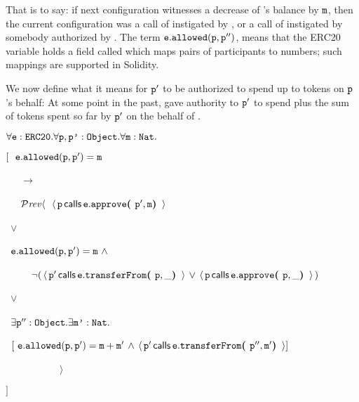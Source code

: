 \noindent
That is to say: if next configuration witnesses a decrease of 's balance by
 $\prg{m}$, then the current configuration was a call of  instigated by
 , or  a call of  instigated by somebody authorized by .
 The term $\prg{e}.\prg{allowed}(\prg{p},\prg{p}'')$,  means that the
ERC20 variable  holds a field called    which maps pairs of participants to numbers; such
mappings are supported in Solidity\cite{Solidity}.
 
We now define what it means for $\prg{p}'$ to be authorized  to  spend 
up to  tokens on  $\prg{p}$'s behalf: At some point in the
past,   gave authority to $\prg{p}'$  to spend   
plus the sum of  tokens
spent so far by $\prg{p}' $ on the behalf of . 

 
\vspace{.15cm}
\noindent
 $\forall \prg{e}:\prg{ERC20}.\forall \prg{p},\prg{p'}:\prg{Object}.\forall \prg{m}:\prg{Nat}.$\\
\strut \hspace{0.3cm} $[\ \ \prg{e}.\prg{allowed}(\prg{p},\prg{p}')=\prg{m} $\\
\strut \hspace{0.4cm} \ \ \ $\longrightarrow$\\
\strut \hspace{0.4cm} \ \ \  
     $\PrevId\langle\ \  \Calls{\prg{p}}  {\prg{approve}}  {\prg{e}} {\prg{p}',\prg{m}} $\\
      \strut \hspace{1.7cm} \ $\vee $\\
\strut \hspace{1.7cm} \  
     $    \prg{e}.\prg{allowed}(\prg{p},\prg{p}')=\prg{m}   
        \  \wedge\ $\\
\strut \hspace{1.5cm} \ \ \ \ \          
$  \neg   (\, {\Calls{\prg{p}'} {\prg{transferFrom}} {\prg{e}} {\prg{p},\_}   } \, \vee \, {\Calls{\prg{p}} {\prg{approve}} {\prg{e}} {\prg{p},\_} } \, ) $\\
      \strut \hspace{1.7cm}\  $\vee $\\
\strut \hspace{1.7cm}   \  $ \exists \prg{p}'':\prg{Object}.\exists\prg{m'}:\prg{Nat}.$\\
 \strut \hspace{1.7cm}\  $[\   
  \prg{e}.\prg{allowed}(\prg{p},\prg{p}')=\prg{m}+\prg{m}'  \, \wedge\,   {\Calls{\prg{p}'} {\prg{transferFrom}} {\prg{e}} {\prg{p}'',\prg{m}'}  }   ]$\\
\strut \hspace{0.4cm} \ \ \  \ \ \  \ \ \ \ \ $\rangle $\\
\strut \hspace{0.3cm} $]$
\vspace{.15cm}
 
